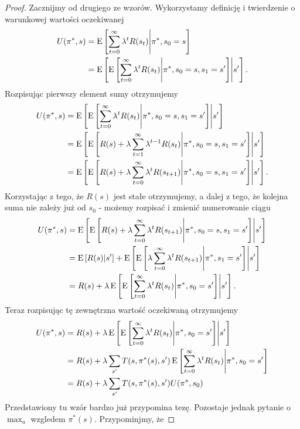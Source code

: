 \documentclass[10pt,a4paper]{book}
\begin{document}
\begin{proof}
Zacznijmy od drugiego ze wzorów. Wykorzystamy definicję i twierdzenie o warunkowej wartości oczekiwanej
\begin{align*}
U(\pi^\ast, s ) & = \ExConditional{\sum_{t=0}^{\infty} \lambda^t R(s_t) }{ \pi^\ast, s_0 = s} \\
& = \ExConditional{ \ExConditional{\sum_{t=0}^{\infty} \lambda^t R(s_t) }{ \pi^\ast, s_0 = s, s_1 = s'} }{s'}.
\end{align*}
Rozpisując pierwszy element sumy otrzymujemy
\begin{align*}
U(\pi^\ast, s ) & = \ExConditional{ \ExConditional{\sum_{t=0}^{\infty} \lambda^t R(s_t) }{ \pi^\ast, s_0 = s, s_1 = s'} }{s'} \\
& = \ExConditional{ \ExConditional{R(s) + \lambda \sum_{t=1}^{\infty} \lambda^{t-1} R(s_t) }{ \pi^\ast, s_0 = s, s_1 = s'} }{s'} \\
& = \ExConditional{ \ExConditional{R(s) + \lambda \sum_{t=0}^{\infty} \lambda^{t} R(s_{t+1}) }{ \pi^\ast, s_0 = s, s_1 = s'} }{s'}.
\end{align*}
Korzystając z tego, że $R(s)$ jest stałe otrzymujemy, a dalej z tego, że kolejna suma nie zależy już od $s_0$ - możemy rozpisać i zmienić numerowanie ciągu
\begin{align*}
U(\pi^\ast, s ) & = \ExConditional{ \ExConditional{R(s) + \lambda \sum_{t=0}^{\infty} \lambda^{t} R(s_{t+1}) }{ \pi^\ast, s_0 = s, s_1 = s'} }{s'} \\
& = \ExConditional{R(s)}{s'} + \ExConditional{ \ExConditional{ \lambda \sum_{t=0}^{\infty} \lambda^{t} R(s_{t+1}) }{ \pi^\ast, s_1 = s'} }{s'}\\
& = R(s) + \lambda \ExConditional{ \ExConditional{ \sum_{t=0}^{\infty} \lambda^{t} R(s_{t}) }{ \pi^\ast, s_0 = s'} }{s'}.
\end{align*}
Teraz rozpisując tę zewnętrzna wartość oczekiwaną otrzymujemy
\begin{align*}
U(\pi^\ast, s ) & = R(s) + \lambda \ExConditional{ \ExConditional{ \sum_{t=0}^{\infty} \lambda^{t} R(s_{t}) }{ \pi^\ast, s_0 = s'} }{s'} \\
& = R(s) + \lambda \sum_{s'} T(s,\pi^\ast(s), s') \ExConditional{ \sum_{t=0}^{\infty} \lambda^{t} R(s_{t}) }{ \pi^\ast, s_0 = s'} \\
& = R(s) + \lambda \sum_{s'} T(s,\pi^\ast(s), s') U(\pi^\ast, s_0)
\end{align*}
Przedstawiony tu wzór bardzo już przypomina tezę. Pozostaje jednak pytanie o $\max_{a}$ wzgledem $\pi^\ast(s)$. Przypominjmy, że 

\end{proof}
\end{document}
